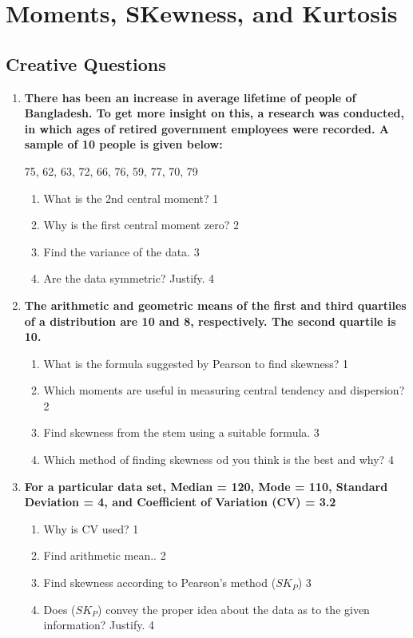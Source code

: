 \documentclass[a4paper,oneside]{book}
\begin{document}
\chapter{Moments, SKewness, and Kurtosis} 
\section{Creative Questions}

  \begin{enumerate}

   \item
	  \textbf{There has been an increase in average lifetime of people of Bangladesh. To get more insight on this, a research was conducted, in which ages of retired government employees were recorded. A sample of 10 people is given below:}
	  
	  \begin{center}
	  75, 62, 63, 72, 66, 76, 59, 77, 70, 79
	  \end{center}
    \begin{enumerate}
    \item
	What is the 2nd central moment? \hfill 1
    \item
	Why is the first central moment zero? \hfill 2
    \item  
	Find the variance of the data. \hfill 3
    \item
	Are the data symmetric? Justify. \hfill 4
  \end{enumerate}
  
   \item
	  \textbf{The arithmetic and geometric means of the first and third quartiles of a distribution are 10 and 8, respectively. The second quartile is 10.} 
  
  \begin{enumerate}
    \item
	What is the formula suggested by Pearson to find skewness? \hfill 1
    \item
	Which moments are useful in measuring central tendency and dispersion?  \hfill 2
    \item  
	Find skewness from the stem using a suitable formula. \hfill 3
    \item
	Which method of finding skewness od you think is the best and why? \hfill 4
\end{enumerate}

 \item
	  \textbf{For a particular data set, Median = 120, Mode = 110, Standard Deviation = 4, and Coefficient of Variation (CV)  = 3.2} 
  
  \begin{enumerate}
    \item
	Why is  CV used?  \hfill 1
    \item
	Find arithmetic mean.. \hfill 2
    \item  
	Find skewness according to Pearson's method ($SK_P$) \hfill 3
    \item
	Does ($SK_P$) convey the proper idea about the data as to the given information? Justify. \hfill 4
  \end{enumerate}
  \end{enumerate}
\end{document}
